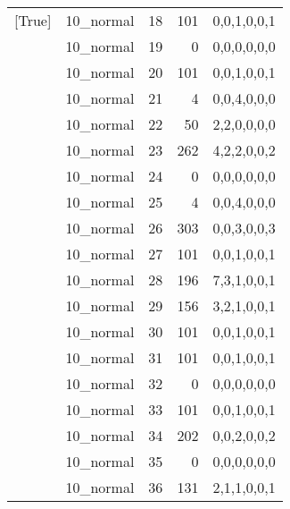 \begin{tabular}{llrrl}
 [True]          & 10\_normal           &            18 &                   101 & 0,0,1,0,0,1   \\
 [True]          & 10\_normal           &            19 &                     0 & 0,0,0,0,0,0   \\
 [True]          & 10\_normal           &            20 &                   101 & 0,0,1,0,0,1   \\
 [True]          & 10\_normal           &            21 &                     4 & 0,0,4,0,0,0   \\
 [True]          & 10\_normal           &            22 &                    50 & 2,2,0,0,0,0   \\
 [True]          & 10\_normal           &            23 &                   262 & 4,2,2,0,0,2   \\
 [True]          & 10\_normal           &            24 &                     0 & 0,0,0,0,0,0   \\
 [True]          & 10\_normal           &            25 &                     4 & 0,0,4,0,0,0   \\
 [True]          & 10\_normal           &            26 &                   303 & 0,0,3,0,0,3   \\
 [True]          & 10\_normal           &            27 &                   101 & 0,0,1,0,0,1   \\
 [True]          & 10\_normal           &            28 &                   196 & 7,3,1,0,0,1   \\
 [True]          & 10\_normal           &            29 &                   156 & 3,2,1,0,0,1   \\
 [True]          & 10\_normal           &            30 &                   101 & 0,0,1,0,0,1   \\
 [True]          & 10\_normal           &            31 &                   101 & 0,0,1,0,0,1   \\
 [True]          & 10\_normal           &            32 &                     0 & 0,0,0,0,0,0   \\
 [True]          & 10\_normal           &            33 &                   101 & 0,0,1,0,0,1   \\
 [True]          & 10\_normal           &            34 &                   202 & 0,0,2,0,0,2   \\
 [True]          & 10\_normal           &            35 &                     0 & 0,0,0,0,0,0   \\
 [True]          & 10\_normal           &            36 &                   131 & 2,1,1,0,0,1   \\

\end{tabular}

